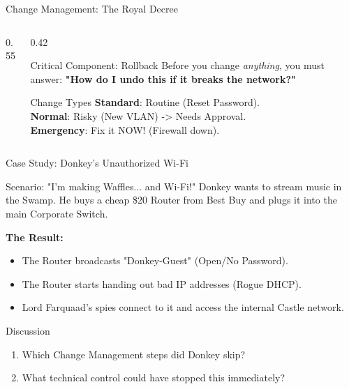 \documentclass[aspectratio=169]{beamer}  %
\begin{document}
\begin{frame}{Change Management: The Royal Decree}
\begin{columns}[T]
\begin{column}{0.55\textwidth}
        \end{column}
        \begin{column}{0.42\textwidth}
            \begin{block}{Critical Component: Rollback}
                \footnotesize
                Before you change \textit{anything}, you must answer:
                \textbf{"How do I undo this if it breaks the network?"}
            \end{block}
            \begin{exampleblock}{Change Types}
                \footnotesize
                \textbf{Standard}: Routine (Reset Password).\\
                \textbf{Normal}: Risky (New VLAN) -> Needs Approval.\\
                \textbf{Emergency}: Fix it NOW! (Firewall down).
            \end{exampleblock}
        \end{column}
    \end{columns}
\end{frame}

\begin{frame}{Case Study: Donkey's Unauthorized Wi-Fi}
    \begin{alertblock}{Scenario: "I'm making Waffles... and Wi-Fi!"}
        \footnotesize
        Donkey wants to stream music in the Swamp. He buys a cheap \$20 Router from Best Buy and plugs it into the main Corporate Switch.
        
        \vspace{0.2em}
        \textbf{The Result:}
        \begin{itemize}
            \item The Router broadcasts "Donkey-Guest" (Open/No Password).
            \item The Router starts handing out bad IP addresses (Rogue DHCP).
            \item Lord Farquaad's spies connect to it and access the internal Castle network.
        \end{itemize}
    \end{alertblock}
    \begin{block}{Discussion}
        \footnotesize
        \begin{enumerate}
            \item Which Change Management steps did Donkey skip?
            \item What technical control could have stopped this immediately?
        \end{enumerate}
    \end{block}
\end{frame}
\end{document}
